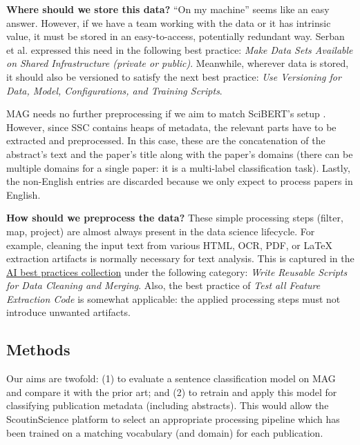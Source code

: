 \begin{displayquote}
\textbf{Where should we store this data?} ``On my machine'' seems like an easy answer. However, if we have a team working with the data or it has intrinsic value, it must be stored in an easy-to-access, potentially redundant way. Serban et al. \cite{serban2020adoption} expressed this need in the following best practice: \textit{Make Data Sets Available on Shared Infrastructure (private or public)}. Meanwhile, wherever data is stored, it should also be versioned to satisfy the next best practice: \textit{Use Versioning for Data, Model, Configurations, and Training Scripts}.
\end{displayquote}

MAG needs no further preprocessing if we aim to match SciBERT's setup \cite{beltagy2019scibert}. However, since SSC contains heaps of metadata, the relevant parts have to be extracted and preprocessed. In this case, these are the concatenation of the abstract's text and the paper's title along with the paper's domains (there can be multiple domains for a single paper: it is a multi-label classification task). Lastly, the non-English entries are discarded because we only expect to process papers in English.

\begin{displayquote}
\textbf{How should we preprocess the data?} These simple processing steps (filter, map, project) are almost always present in the data science lifecycle. For example, cleaning the input text from various HTML, OCR, PDF, or \LaTeX \hskip 0.12cm extraction artifacts is normally necessary for text analysis. This is captured in the \href{https://se-ml.github.io/practices}{AI best practices collection} under the following category: \textit{Write Reusable Scripts for Data Cleaning and Merging}. Also, the best practice of \textit{Test all Feature Extraction Code} is somewhat applicable: the applied processing steps must not introduce unwanted artifacts.
\end{displayquote}

\subsection{Methods}

Our aims are twofold: (1) to evaluate a sentence classification model on MAG and compare it with the prior art; and (2) to retrain and apply this model for classifying publication metadata (including abstracts). This would allow the ScoutinScience platform to select an appropriate processing pipeline which has been trained on a matching vocabulary (and domain) for each publication. 

